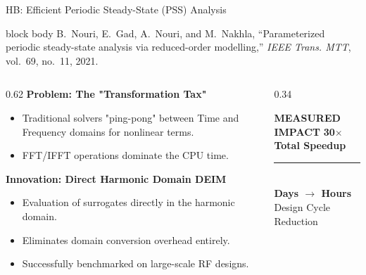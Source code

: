 \begin{frame}[t]{HB: Efficient Periodic Steady-State (PSS) Analysis}
	\vspace{1ex}

	\begin{beamercolorbox}[wd=\textwidth, sep=1ex, rounded=true]{block body}
		\scriptsize B.~Nouri, E.~Gad, A.~Nouri, and M.~Nakhla, ``Parameterized periodic steady-state analysis via reduced-order modelling,'' \emph{IEEE Trans. MTT}, vol.~69, no.~11, 2021.
	\end{beamercolorbox}

	\vspace{2ex}

	\begin{columns}[T, onlytextwidth]
		\begin{column}{0.62\textwidth}
			\small
			\textbf{\textcolor{blue!80!black}{Problem: The "Transformation Tax"}}
			\begin{itemize}
				\item Traditional solvers "ping-pong" between Time and Frequency domains for nonlinear terms.
				\item FFT/IFFT operations dominate the CPU time.
			\end{itemize}

			\vspace{2ex}
			\textbf{\textcolor{blue!80!black}{Innovation: Direct Harmonic Domain DEIM}}
			\begin{itemize}
				\item Evaluation of surrogates directly in the harmonic domain.
				\item Eliminates domain conversion overhead entirely.
				\item Successfully benchmarked on large-scale RF designs.
			\end{itemize}
		\end{column}

		\begin{column}{0.34\textwidth}
			\begin{alertblock}{\centering \textbf{MEASURED IMPACT}}
				\centering
				\vspace{1ex}
				{\huge \textbf{30$\times$}} \\
				\footnotesize \textbf{Total Speedup} \\
				\vspace{1.5ex}
				\textcolor{red!20}{\rule{0.8\textwidth}{0.5pt}} \\
				\vspace{1.5ex}
				\small \textbf{Days $\rightarrow$ Hours} \\
				\footnotesize Design Cycle Reduction
				\vspace{1ex}
			\end{alertblock}
		\end{column}
	\end{columns}


\end{frame}
